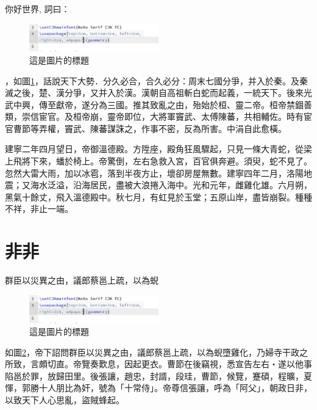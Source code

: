\documentclass[12pt]{article}
\begin{document}
\hspace{2em}你好世界, 詞曰：

\begin{figure}[h]
    \centering
    \includegraphics[width=0.5\textwidth]{截圖 2025-01-24 03.21.17.png}  %
    \caption{這是圖片的標題}
    \label{fig:example1}  %
\end{figure}
，如圖\ref{fig:example1}，話說天下大勢．分久必合，合久必分：周末七國分爭，并入於秦。及秦滅之後，楚、漢分爭，又并入於漢。漢朝自高祖斬白蛇而起義，一統天下。後來光武中興，傳至獻帝，遂分為三國。推其致亂之由，殆始於桓、靈二帝。桓帝禁錮善類，崇信宦官。及桓帝崩，靈帝即位，大將軍竇武、太傅陳蕃，共相輔佐。時有宦官曹節等弄權，竇武、陳蕃謀誅之，作事不密，反為所害。中涓自此愈橫。

建寧二年四月望日，帝御溫德殿。方陞座，殿角狂風驟起，只見一條大青蛇，從梁上飛將下來，蟠於椅上。帝驚倒，左右急救入宮，百官俱奔避。須臾，蛇不見了。忽然大雷大雨，加以冰雹，落到半夜方止，壞卻房屋無數。建寧四年二月，洛陽地震；又海水泛溢，沿海居民，盡被大浪捲入海中。光和元年，雌雞化雄。六月朔，黑氣十餘丈，飛入溫德殿中。秋七月，有虹見於玉堂；五原山岸，盡皆崩裂。種種不祥，非止一端。



\section{非非}
\hspace{2em}群臣以災異之由，議郎蔡邕上疏，以為蜺
\begin{figure}[h]
    \centering
    \includegraphics[width=0.5\textwidth]{截圖 2025-01-24 03.21.17.png}  %
    \caption{這是圖片的標題}
    \label{fig:example2}  %
\end{figure}

如圖\ref{fig:example2}，帝下詔問群臣以災異之由，議郎蔡邕上疏，以為蜺墮雞化，乃婦寺干政之所致，言頗切直。帝覽奏歎息，因起更衣。曹節在後竊視，悉宣告左右‧遂以他事陷邕於罪，放歸田里。後張讓，趙忠，封諝，段珪，曹節，候覽，蹇碩，程曠，夏惲，郭勝十人朋比為奸，號為「十常侍」。帝尊信張讓，呼為「阿父」，朝政日非，以致天下人心思亂，盜賊蜂起。
\end{document}
